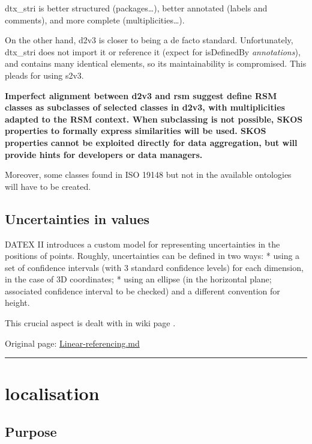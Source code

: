 \documentclass[
  11pt,
]{article}
\begin{document}
dtx\_stri is better structured (packages\ldots), better annotated
(labels and comments), and more complete (multiplicities\ldots).

On the other hand, d2v3 is closer to being a de facto standard.
Unfortunately, dtx\_stri does not import it or reference it (expect for
isDefinedBy \emph{annotations}), and contains many identical elements,
so its maintainability is compromised. This pleads for using s2v3.

\textbf{Imperfect alignment between d2v3 and rsm suggest define RSM
classes as subclasses of selected classes in d2v3, with multiplicities
adapted to the RSM context. When subclassing is not possible, SKOS
properties to formally express similarities will be used. SKOS
properties cannot be exploited directly for data aggregation, but will
provide hints for developers or data managers.}

Moreover, some classes found in ISO 19148 but not in the available
ontologies will have to be created.

\hypertarget{uncertainties-in-values}{%
\subsection{Uncertainties in values}\label{uncertainties-in-values}}

DATEX II introduces a custom model for representing uncertainties in the
positions of points. Roughly, uncertainties can be defined in two ways:
* using a set of confidence intervals (with 3 standard confidence
levels) for each dimension, in the case of 3D coordinates; * using an
ellipse (in the horizontal plane; associated confidence interval to be
checked) and a different convention for height.

This crucial aspect is dealt with in wiki page .

Original page:
\href{https://github.com/UICrail/CDM-RSM/wiki/Linear-referencing}{Linear-referencing.md}

\begin{center}\rule{0.5\linewidth}{0.5pt}\end{center}

\hypertarget{localisation}{%
\section{localisation}\label{localisation}}

\hypertarget{purpose-2}{%
\subsection{Purpose}\label{purpose-2}}
\end{document}
